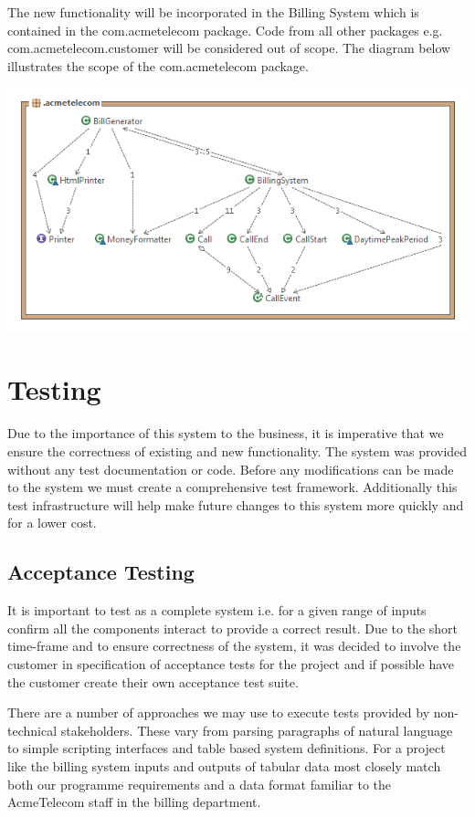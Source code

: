 \documentclass[pdftex,11pt,a4paper]{article}
\begin{document}
The new functionality will be incorporated in the Billing System which is contained in the com.acmetelecom package. Code from all other packages e.g. com.acmetelecom.customer will be considered out of scope. The diagram below illustrates the scope of the com.acmetelecom package. 

\begin{center}
	\includegraphics[scale=0.52]{images/Acme_Telecom_Structure.png}
\end{center}

\section{Testing}
Due to the importance of this system to the business, it is imperative that we ensure the correctness of existing and new functionality. The system was provided without any test documentation or code. Before any modifications can be made to the system we must create a comprehensive test framework. Additionally this test infrastructure will help make future changes to this system more quickly and for a lower cost.

\subsection{Acceptance Testing}
It is important to test as a complete system i.e. for a given range of inputs confirm all the components interact to provide a correct result. Due to the short time-frame and to ensure correctness of the system, it was decided to involve the customer in specification of acceptance tests for the project and if possible have the customer create their own acceptance test suite. 

There are a number of approaches we may use to execute tests provided by non-technical stakeholders. These vary from parsing paragraphs of natural language to simple scripting interfaces and table based system definitions. For a project like the billing system inputs and outputs of tabular data most closely match both our programme requirements and a data format familiar to the AcmeTelecom staff in the billing department.
\end{document}
